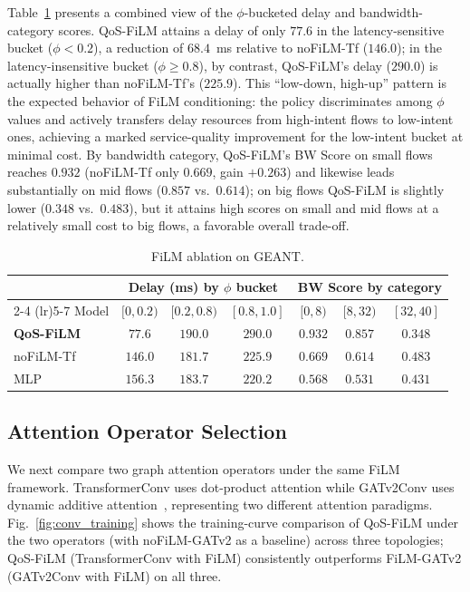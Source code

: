 Table~\ref{tab:film_w150_bucketed} presents a combined view of the $\phi$-bucketed delay and bandwidth-category scores. QoS-FiLM attains a delay of only $77.6$ in the latency-sensitive bucket ($\phi<0.2$), a reduction of $68.4$~ms relative to noFiLM-Tf ($146.0$); in the latency-insensitive bucket ($\phi\geq 0.8$), by contrast, QoS-FiLM's delay ($290.0$) is actually higher than noFiLM-Tf's ($225.9$). This ``low-down, high-up'' pattern is the expected behavior of FiLM conditioning: the policy discriminates among $\phi$ values and actively transfers delay resources from high-intent flows to low-intent ones, achieving a marked service-quality improvement for the low-intent bucket at minimal cost. By bandwidth category, QoS-FiLM's BW Score on small flows reaches $0.932$ (noFiLM-Tf only $0.669$, gain $+0.263$) and likewise leads substantially on mid flows ($0.857$ vs.\ $0.614$); on big flows QoS-FiLM is slightly lower ($0.348$ vs.\ $0.483$), but it attains high scores on small and mid flows at a relatively small cost to big flows, a favorable overall trade-off.

\begin{table}[t]
\centering
\caption{FiLM ablation on GEANT.}
\label{tab:film_w150_bucketed}
\setlength{\tabcolsep}{3pt}
\begin{tabular}{lccc|ccc}
\toprule
& \multicolumn{3}{c}{Delay (ms) by $\phi$ bucket} & \multicolumn{3}{c}{BW Score by category} \\
\cmidrule(lr){2-4} \cmidrule(lr){5-7}
Model & $[0,0.2)$ & $[0.2,0.8)$ & $[0.8,1.0]$ & $[0,8)$ & $[8,32)$ & $[32,40]$ \\
\midrule
\textbf{QoS-FiLM} & $\mathbf{77.6}$ & $190.0$ & $290.0$ & $\mathbf{0.932}$ & $\mathbf{0.857}$ & $0.348$ \\
noFiLM-Tf        & $146.0$ & $181.7$ & $225.9$ & $0.669$ & $0.614$ & $0.483$ \\
MLP              & $156.3$ & $183.7$ & $220.2$ & $0.568$ & $0.531$ & $0.431$ \\
\bottomrule
\end{tabular}
\end{table}

\subsection{Attention Operator Selection}
\label{sec:exp:conv}

We next compare two graph attention operators under the same FiLM framework. TransformerConv uses dot-product attention while GATv2Conv uses dynamic additive attention~\cite{Brody2022_GATv2}, representing two different attention paradigms. Fig.~\ref{fig:conv_training} shows the training-curve comparison of QoS-FiLM under the two operators (with noFiLM-GATv2 as a baseline) across three topologies; QoS-FiLM (TransformerConv with FiLM) consistently outperforms FiLM-GATv2 (GATv2Conv with FiLM) on all three.



